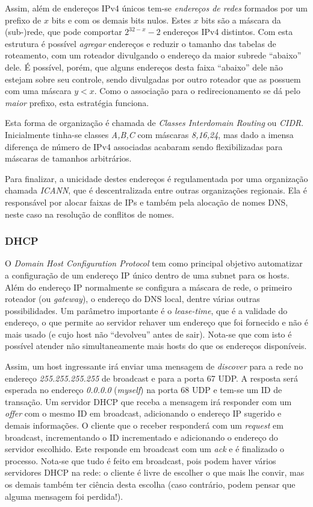 Assim, além de endereços IPv4 únicos tem-se \emph{endereços de redes} formados por um prefixo de $x$ bits e com os demais bits nulos.
Estes $x$ bits são a máscara da (sub-)rede, que pode comportar $2^{32-x} - 2$ endereços IPv4 distintos.
Com esta estrutura é possível \emph{agregar} endereços e reduzir o tamanho das tabelas de roteamento, 
com um roteador divulgando o endereço da maior subrede ``abaixo'' dele.
É possível, porém, que alguns endereços desta faixa ``abaixo'' dele não estejam sobre seu controle, 
sendo divulgadas por outro roteador que as possuem com uma máscara $y < x$.
Como o associação para o redirecionamento se dá pelo \emph{maior} prefixo, esta estratégia funciona.

Esta forma de organização é chamada de \emph{Classes Interdomain Routing} ou \emph{CIDR}.
Inicialmente tinha-se classes \emph{A,B,C} com máscaras \emph{8,16,24}, mas dado a imensa diferença de número de IPv4 associadas acabaram sendo flexibilizadas para máscaras de tamanhos arbitrários.

Para finalizar, a unicidade destes endereços é regulamentada por uma organização chamada \emph{ICANN}, que é descentralizada entre outras organizações regionais.
Ela é responsável por alocar faixas de IPs e também pela alocação de nomes DNS, neste caso na resolução de conflitos de nomes.

\subsubsection{DHCP}

O \emph{Domain Host Configuration Protocol} tem como principal objetivo automatizar a configuração de um endereço IP único dentro de uma subnet para os hosts.
Além do endereço IP normalmente se configura a máscara de rede, o primeiro roteador (ou \emph{gateway}), o endereço do DNS local, dentre várias outras possibilidades.
Um parâmetro importante é o \emph{lease-time}, que é a validade do endereço, o que permite ao servidor rehaver um endereço que foi fornecido e não é mais usado (e cujo host não ``devolveu'' antes de sair).
Nota-se que com isto é possível atender não simultaneamente mais hosts do que os endereços disponíveis.

Assim, um host ingressante irá enviar uma mensagem de \emph{discover} para a rede no endereço \emph{255.255.255.255} de broadcast e para a porta 67 UDP.
A resposta será esperada no endereço \emph{0.0.0.0} (\emph{myself}) na porta 68 UDP e tem-se um ID de transação.
Um servidor DHCP que receba a mensagem irá responder com um \emph{offer} com o mesmo ID em broadcast, adicionando o endereço IP sugerido e demais informações.
O cliente que o receber responderá com um \emph{request} em broadcast, incrementando o ID incrementado e adicionando o endereço do servidor escolhido.
Este responde em broadcast com um \emph{ack} e é finalizado o processo.
Nota-se que tudo é feito em broadcast, pois podem haver vários servidores DHCP na rede: o cliente é livre de escolher o que mais lhe convir, 
mas os demais também ter ciência desta escolha (caso contrário, podem pensar que alguma mensagem foi perdida!).

